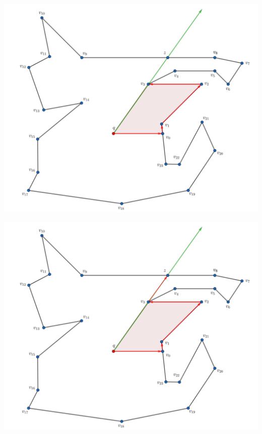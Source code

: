 \begin{frame}
  \centering \includegraphics[width=0.70 \paperwidth]{images/Ejecucion/e06.png}
\end{frame}

\begin{frame}
  \centering \includegraphics[width=0.70 \paperwidth]{images/Ejecucion/e07.png}
\end{frame}


